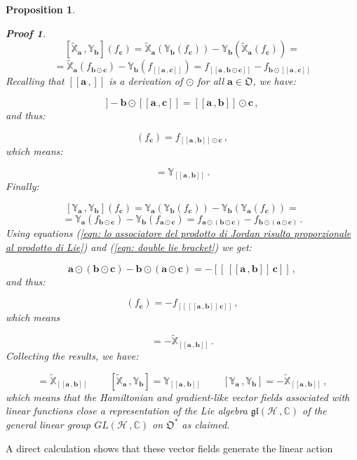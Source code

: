\documentclass[11pt]{article}
\newcommand{\be}{\begin{equation}}
\newcommand{\ee}{\end{equation}}
\newcommand{\obsp}{\mathfrak{O}}
\newtheorem{prop}{Proposition}
\newtheorem*{pf}{Proof}
\begin{document}
\begin{prop}
\begin{pf}
$$
[\widetilde{\mathbb{X}}_{\mathbf{a}}\,,\mathbb{Y}_{\mathbf{b}}](f_{\mathbf{c}})=\widetilde{\mathbb{X}}_{\mathbf{a}}(\mathbb{Y}_{\mathbf{b}}(f_{\mathbf{c}})) - \mathbb{Y}_{\mathbf{b}}(\widetilde{\mathbb{X}}_{\mathbf{a}}(f_{\mathbf{c}}))=
$$
$$
=\widetilde{\mathbb{X}}_{\mathbf{a}}\left(f_{\mathbf{b}\odot\mathbf{c}}\right) - \mathbb{Y}_{\mathbf{b}}(f_{[[\mathbf{a}\,,\mathbf{c}]]})=f_{[[\mathbf{a}\,,\mathbf{b}\odot\mathbf{c}]]}  - f_{\mathbf{b}\odot[[\mathbf{a}\,,\mathbf{c}]]}
$$
Recalling that $[[\mathbf{a}\,,]]$ is a derivation of $\odot$ for all $\mathbf{a}\in\obsp$, we have:

\be
[[\mathbf{a}\,,\mathbf{b}\odot\mathbf{c}]] - \mathbf{b}\odot[[\mathbf{a}\,,\mathbf{c}]]=[[\mathbf{a}\,,\mathbf{b}]]\odot\mathbf{c}\,,
\ee
and thus:

\be
[\widetilde{\mathbb{X}}_{\mathbf{a}}\,,\mathbb{Y}_{\mathbf{b}}](f_{\mathbf{c}})=f_{[[\mathbf{a}\,,\mathbf{b}]]\odot\mathbf{c}}\,,
\ee
which means:

\be
[\widetilde{\mathbb{X}}_{\mathbf{a}}\,,\mathbb{Y}_{\mathbf{b}}]=\mathbb{Y}_{[[\mathbf{a}\,,\mathbf{b}]]}\,.
\ee
Finally:

$$
[\mathbb{Y}_{\mathbf{a}}\,,\mathbb{Y}_{\mathbf{b}}](f_{\mathbf{c}})=\mathbb{Y}_{\mathbf{a}}(\mathbb{Y}_{\mathbf{b}}(f_{\mathbf{c}})) - \mathbb{Y}_{\mathbf{b}}(\mathbb{Y}_{\mathbf{a}}(f_{\mathbf{c}}))=
$$
$$
=\mathbb{Y}_{\mathbf{a}}\left(f_{\mathbf{b}\odot\mathbf{c}}\right) - \mathbb{Y}_{\mathbf{b}}(f_{\mathbf{a}\odot\mathbf{c}})=f_{\mathbf{a}\odot(\mathbf{b}\odot\mathbf{c})} - f_{\mathbf{b}\odot(\mathbf{a}\odot\mathbf{c})}\,.
$$
Using equations (\ref{eqn: lo associatore del prodotto di Jordan risulta proporzionale al prodotto di Lie}) and (\ref{eqn: double lie bracket}) we get:

\be\label{eqn: importante}
\mathbf{a}\odot(\mathbf{b}\odot\mathbf{c}) - \mathbf{b}\odot(\mathbf{a}\odot\mathbf{c})=-\left[\left[\,[[\mathbf{a}\,,\mathbf{b}]]\,\mathbf{c}\right]\right]\,,
\ee
and thus:

\be
[\mathbb{Y}_{\mathbf{a}}\,,\mathbb{Y}_{\mathbf{b}}](f_{\mathbf{c}})=-f_{\left[\left[\,[[\mathbf{a}\,,\mathbf{b}]]\,\mathbf{c}\right]\right]}\,,
\ee
which means

\be
[\mathbb{Y}_{\mathbf{a}}\,,\mathbb{Y}_{\mathbf{b}}]=-\widetilde{\mathbb{X}}_{[[\mathbf{a}\,,\mathbf{b}]]}\,.
\ee
Collecting the results, we have:

\be
[\widetilde{\mathbb{X}}_{\mathbf{a}}\,,\widetilde{\mathbb{X}}_{\mathbf{b}}]=\widetilde{\mathbb{X}}_{[[\mathbf{a}\,,\mathbf{b}]]}\;\;\;\;\;\;\;\;[\widetilde{\mathbb{X}}_{\mathbf{a}}\,,\mathbb{Y}_{\mathbf{b}}]=\mathbb{Y}_{[[\mathbf{a}\,,\mathbf{b}]]}\;\;\;\;\;\;\;\;[\mathbb{Y}_{\mathbf{a}}\,,\mathbb{Y}_{\mathbf{b}}]=-\widetilde{\mathbb{X}}_{[[\mathbf{a}\,,\mathbf{b}]]}\,,
\ee
which means that the Hamiltonian and gradient-like vector fields associated with linear functions close a representation of the Lie algebra $\mathfrak{gl}(\mathcal{H}\,,\mathbb{C})$ of the general linear group $GL(\mathcal{H}\,,\mathbb{C})$ on $\obsp^{*}$ as claimed.
\end{pf}
\end{prop}
A direct calculation shows that these vector fields generate the linear action 
\end{document}

